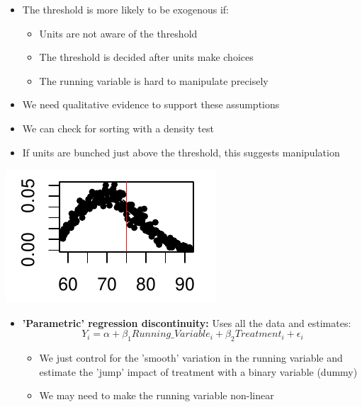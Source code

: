 \documentclass[xcolor=x11names,compress]{beamer}\usepackage[]{graphicx}\usepackage[]{color}
\renewcommand{\(}{\begin{columns}}
\renewcommand{\)}{\end{columns}}
\newcommand{\<}[1]{\begin{column}{#1}}
\renewcommand{\>}{\end{column}}
\begin{document}
\begin{frame}
\begin{itemize}
\item The threshold is more likely to be exogenous if:
\pause
\begin{itemize}
\item Units are not aware of the threshold
\pause
\item The threshold is decided after units make choices
\pause
\item The running variable is hard to manipulate precisely
\pause
\end{itemize}
\item We need qualitative evidence to support these assumptions
\end{itemize}
\end{frame}

\begin{frame}
\begin{itemize}
\item We can check for sorting with a density test
\item If units are bunched just above the threshold, this suggests manipulation
\end{itemize}

\begin{center}
\includegraphics[scale=2]{figure/Density-2.pdf}
\end{center}
\end{frame}

\begin{frame}
\begin{itemize}
\item \textbf{'Parametric' regression discontinuity:} Uses all the data and estimates:
$$Y_i = \alpha + \beta_1 Running\_Variable_i + \beta_2 Treatment_i + \epsilon_i$$
\pause
\begin{itemize}
\item We just control for the 'smooth' variation in the running variable and estimate the 'jump' impact of treatment with a binary variable (dummy)
\pause
\item We may need to make the running variable non-linear
\end{itemize}
\end{itemize}
\end{frame}
\end{document}
